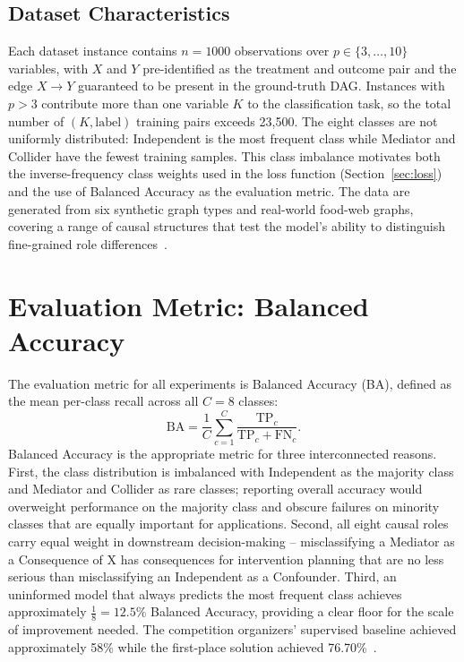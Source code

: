 \subsection{Dataset Characteristics}
\label{sec:data_characteristics}

Each dataset instance contains $n = 1000$ observations over $p \in \{3,\ldots,10\}$ variables, with $X$ and $Y$ pre-identified as the treatment and outcome pair and the edge $X \to Y$ guaranteed to be present in the ground-truth DAG. Instances with $p > 3$ contribute more than one variable $K$ to the classification task, so the total number of $(K, \mathrm{label})$ training pairs exceeds 23,500. The eight classes are not uniformly distributed: Independent is the most frequent class while Mediator and Collider have the fewest training samples. This class imbalance motivates both the inverse-frequency class weights used in the loss function (Section~\ref{sec:loss}) and the use of Balanced Accuracy as the evaluation metric. The data are generated from six synthetic graph types and real-world food-web graphs, covering a range of causal structures that test the model's ability to distinguish fine-grained role differences~\cite{olivetti2025adialab}.

\section{Evaluation Metric: Balanced Accuracy}
\label{sec:metric}

The evaluation metric for all experiments is Balanced Accuracy (BA), defined as the mean per-class recall across all $C = 8$ classes:
\begin{equation}
\mathrm{BA} = \frac{1}{C} \sum_{c=1}^{C} \frac{\mathrm{TP}_c}{\mathrm{TP}_c + \mathrm{FN}_c}.
\label{eq:balanced_acc}
\end{equation}
Balanced Accuracy is the appropriate metric for three interconnected reasons. First, the class distribution is imbalanced with Independent as the majority class and Mediator and Collider as rare classes; reporting overall accuracy would overweight performance on the majority class and obscure failures on minority classes that are equally important for applications. Second, all eight causal roles carry equal weight in downstream decision-making -- misclassifying a Mediator as a Consequence of X has consequences for intervention planning that are no less serious than misclassifying an Independent as a Confounder. Third, an uninformed model that always predicts the most frequent class achieves approximately $\frac{1}{8} = 12.5\%$ Balanced Accuracy, providing a clear floor for the scale of improvement needed. The competition organizers' supervised baseline achieved approximately 58\% while the first-place solution achieved 76.70\%~\cite{olivetti2025adialab}.


